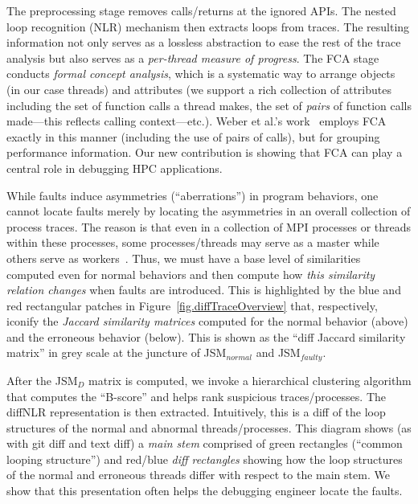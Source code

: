 The preprocessing stage removes calls/returns at the ignored APIs.
%
The nested loop recognition (NLR)
mechanism then extracts loops from traces.
The resulting information not only
serves as a lossless abstraction to
ease the rest of the trace analysis but also
serves as a {\em per-thread measure of progress}.
%
The FCA stage conducts {\em formal concept analysis}, which
is a systematic way to arrange objects (in our case threads)
and attributes (we support a rich collection of attributes
including the set of function calls a thread makes, the
set of {\em pairs} of function calls made---this reflects calling
context---etc.).
%
Weber et al.'s work~\cite{weberStructural,clbook} employs FCA exactly in
this manner (including the use of pairs of calls),
but for grouping performance information.
%
Our new contribution is showing that FCA can play a central
role in debugging HPC applications.


While faults induce asymmetries (``aberrations'') in program behaviors,
one cannot locate faults merely by locating the asymmetries in
an overall collection of process traces.
%
The reason is that even in a collection of MPI processes or threads within
these processes, some processes/threads may serve as a master while others
serve as workers~\cite{patterns-for-par-prog-mattson}.
%
Thus, we must have a base level of similarities computed even for normal
behaviors and then compute how {\em this similarity relation changes} when
faults are introduced.
%
This is highlighted by
the blue and red rectangular patches in
Figure~\ref{fig.diffTraceOverview} that, respectively,
iconify the {\em Jaccard similarity
  matrices} computed for the normal behavior (above) and
the erroneous behavior (below).
%
This is shown as
the ``diff Jaccard similarity matrix'' in grey scale at the
juncture of JSM$_{normal}$ and JSM$_{faulty}$.


After the JSM$_{D}$ matrix is computed, we 
invoke a hierarchical clustering algorithm that computes the ``B-score''
and helps rank suspicious traces/processes.
%
The diffNLR representation is then extracted.
%
Intuitively, this is a diff of the loop structures of the normal and abnormal
threads/processes.
%
This diagram shows (as with git diff and text diff) a {\em main stem} comprised of green rectangles
(``common looping structure'') and red/blue {\em diff rectangles} showing how the loop structures of
the normal and erroneous threads differ with respect to the main stem.
%
We show that this presentation often helps the debugging engineer
locate the faults.



